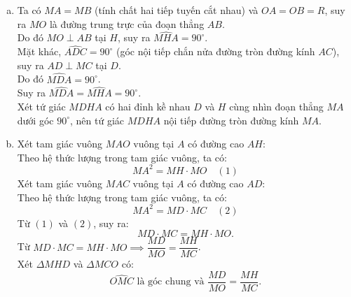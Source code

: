 \begin{bt}
{\begin{center}
	\end{center}
	\begin{enumerate}[a)]
		\item Ta có $MA = MB$ (tính chất hai tiếp tuyến cắt nhau) và $OA = OB = R$, suy ra $MO$ là đường trung trực của đoạn thẳng $AB$.\\
		Do đó $MO \perp AB$ tại $H$, suy ra $\widehat{MHA} = 90^\circ$.\\
		Mặt khác, $\widehat{ADC} = 90^\circ$ (góc nội tiếp chắn nửa đường tròn đường kính $AC$), suy ra $AD \perp MC$ tại $D$.\\
		Do đó $\widehat{MDA} = 90^\circ$.\\
		Suy ra $\widehat{MDA} = \widehat{MHA} = 90^\circ$.\\
		Xét tứ giác $MDHA$ có hai đỉnh kề nhau $D$ và $H$ cùng nhìn đoạn thẳng $MA$ dưới góc $90^\circ$, nên tứ giác $MDHA$ nội tiếp đường tròn đường kính $MA$.
		\item Xét tam giác vuông $MAO$ vuông tại $A$ có đường cao $AH$:\\
		Theo hệ thức lượng trong tam giác vuông, ta có:
		$$MA^2 = MH \cdot MO \quad (1)$$
		Xét tam giác vuông $MAC$ vuông tại $A$ có đường cao $AD$:\\
		Theo hệ thức lượng trong tam giác vuông, ta có:
		$$MA^2 = MD \cdot MC \quad (2)$$
		Từ $(1)$ và $(2)$, suy ra:
		$$MD \cdot MC = MH \cdot MO.$$
		Từ $MD \cdot MC = MH \cdot MO \implies \dfrac{MD}{MO} = \dfrac{MH}{MC}$.\\
		Xét $\Delta MHD$ và $\Delta MCO$ có:
		$$\widehat{OMC}\text{ là góc chung và } \frac{MD}{MO} = \frac{MH}{MC}.$$

\end{enumerate}}
\end{bt}
